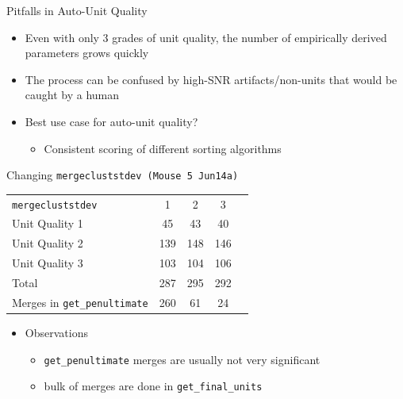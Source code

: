 \documentclass{beamer}
\begin{document}
    \begin{frame}{Pitfalls in Auto-Unit Quality}
        \begin{itemize}
            \pause
            \item Even with only 3 grades of unit quality, the number of
empirically derived parameters grows quickly
            \pause
            \item The process can be confused by high-SNR artifacts/non-units
that would be caught by a human
            \pause
            \item Best use case for auto-unit quality?
            \begin{itemize}
            \pause
                \item Consistent scoring of different sorting algorithms
            \end{itemize}
        \end{itemize}
    \end{frame}

    \begin{frame}{Changing \texttt{mergecluststdev (Mouse 5 Jun14a)}}
        \begin{center}
        \begin{tabular}{l c c c r}
        \pause
        \texttt{mergecluststdev}&1&2&3\\
        \pause
        Unit Quality 1&45&43&40\\
        \pause
        Unit Quality 2&139&148&146\\
        \pause
        Unit Quality 3&103&104&106\\
        \pause
        Total&287&295&292\\
        \pause
        Merges in \texttt{get\_penultimate}&260&61&24
        \end{tabular} 
        \end{center}
        \begin{itemize}
            \pause
            \item Observations
            \begin{itemize}
                \item \texttt{get\_penultimate} merges are usually not very
significant
                \item bulk of merges are done in \texttt{get\_final\_units}
            \end{itemize}
        \end{itemize}
    \end{frame}
\end{document}
